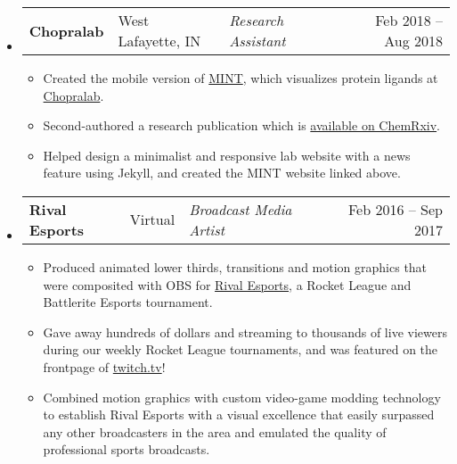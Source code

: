 \documentclass[11pt]{extarticle}
\makeatletter
\newcommand{\entry}[5]{
	\begin{tabularx}{\linewidth}{l@{, }l@{ – }lXr}
			\textbf{#1} & #2 & \lighttext \textit{#3} & & #4 – #5
	\end{tabularx}
	\vspace{-16pt}
}
\makeatother
\begin{document}
\begin{itemize}[leftmargin=1em]
	\item[]
	\entry{Chopralab}{West Lafayette, IN}{Research Assistant}{Feb 2018}{Aug 2018}
	\begin{itemize}
		\item Created the mobile version of
		\href{https://chopralab.github.io/MINT/index.html}{MINT}, which visualizes
		protein ligands at \href{http://www.chopralab.com/}{Chopralab}.
		\item Second-authored a research publication which is
		\href{https://doi.org/10.26434/chemrxiv.9889994.v1}{available on ChemRxiv}.
		\item Helped design a minimalist and responsive lab website with a news
		feature using Jekyll, and created the MINT website linked above.
	\end{itemize}

	\item[]
	\entry{Rival Esports}{Virtual}{Broadcast Media Artist}{Feb 2016}{Sep 2017}
	\begin{itemize}
		\item Produced animated lower thirds, transitions and motion graphics that
		were composited with OBS for \href{https://rivalesports.com/}{Rival
		Esports}, a Rocket League and Battlerite Esports tournament.
		\item Gave away hundreds of dollars and streaming to thousands of live
		viewers during our weekly Rocket League tournaments, and was featured on the
		frontpage of \href{https://www.twitch.tv/rivalesports}{twitch.tv}!
		\item Combined motion graphics with custom video-game modding technology to
		establish Rival Esports with a visual excellence that easily surpassed any
		other broadcasters in the area and emulated the quality of professional
		sports broadcasts.
	\end{itemize}
\end{itemize}
\vspace{-20pt}
\end{document}

